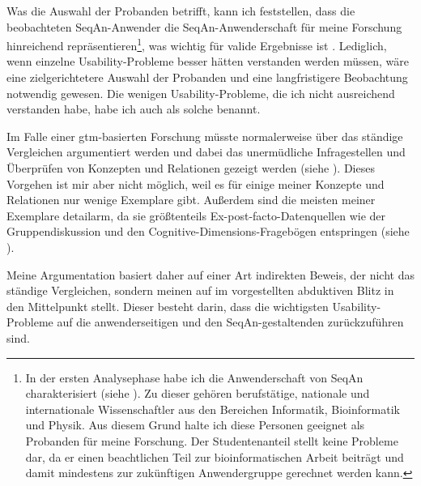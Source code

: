 Was die Auswahl der Probanden betrifft, kann ich feststellen, dass die beobachteten SeqAn-Anwender die SeqAn-Anwenderschaft für meine Forschung hinreichend repräsentieren\footnote{In der ersten Analysephase habe ich die Anwenderschaft von SeqAn charakterisiert (siehe ). Zu dieser gehören berufstätige, nationale und internationale Wissenschaftler aus den Bereichen Informatik, Bioinformatik und Physik. Aus diesem Grund halte ich diese Personen geeignet als Probanden für meine Forschung. Der Studentenanteil stellt keine Probleme dar, da er einen beachtlichen Teil zur bioinformatischen Arbeit beiträgt \citep{Letondal:2006dy} und damit mindestens zur zukünftigen Anwendergruppe gerechnet werden kann.}, was wichtig für valide Ergebnisse ist \citep{Clarke:2004te,Henning:2007kg}. Lediglich, wenn einzelne Usability-Probleme besser hätten verstanden werden müssen, wäre eine zielgerichtetere Auswahl der Probanden und eine langfristigere Beobachtung notwendig gewesen. Die wenigen Usability-Probleme, die ich nicht ausreichend verstanden habe, habe ich auch als solche benannt.


Im Falle einer \gls{gtm}-basierten Forschung müsste normalerweise über das ständige Vergleichen argumentiert werden und dabei das unermüdliche Infragestellen und Überprüfen von Konzepten und Relationen gezeigt werden (siehe ). Dieses Vorgehen ist mir aber nicht möglich, weil es für einige meiner Konzepte und Relationen nur wenige Exemplare gibt. Außerdem sind die meisten meiner Exemplare detailarm, da sie größtenteils Ex-post-facto-Datenquellen wie der Gruppendiskussion und den Cognitive-Dimensions-Fragebögen entspringen (siehe ).

Meine Argumentation basiert daher auf einer Art indirekten Beweis, der nicht das ständige Vergleichen, sondern meinen auf im  vorgestellten abduktiven Blitz in den Mittelpunkt stellt. Dieser besteht darin, dass die wichtigsten Usability-Probleme auf die anwenderseitigen  und den SeqAn-gestaltenden  zurückzuführen sind.

